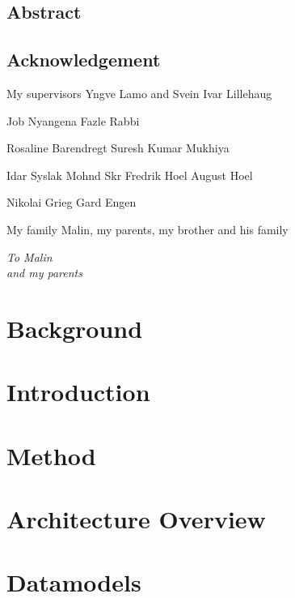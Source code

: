 \documentclass[a4paper,12pt,oneside]{book}
\begin{document}
\frontmatter


\newpage
\section*{Abstract}
\newpage
\section*{Acknowledgement}
My supervisors Yngve Lamo and Svein Ivar Lillehaug

Job Nyangena
Fazle Rabbi

Rosaline Barendregt
Suresh Kumar Mukhiya

Idar Syslak
Mohnd Skr
Fredrik Hoel
August Hoel

Nikolai Grieg
Gard Engen

My family Malin, my parents, my brother and his family
\newpage
\begin{flushright}
	\null{}
	\itshape
	To Malin \\
	and my parents
	\null
\end{flushright}

\tableofcontents
\listoffigures
\listoftables
\mainmatter


\chapter{Background}


\chapter{Introduction}



\chapter{Method}


\chapter{Architecture Overview}


\chapter{Datamodels}
\end{document}
